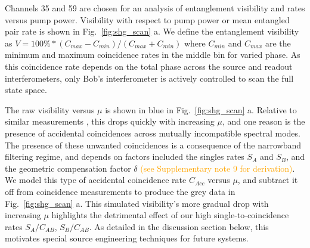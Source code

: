 \documentclass[11pt]{caltech_thesis} %
\begin{document}
Channels 35 and 59 are chosen for an analysis of entanglement visibility and rates versus pump power. Visibility with respect to pump power or mean entangled pair rate is shown in Fig.~\ref{fig:shg_scan} a. We define the entanglement visibility as $V = 100\%*(C_{max} - C_{min})/(C_{max} + C_{min})$ where $C_{min}$ and $C_{max}$ are the minimum and maximum coincidence rates in the middle bin for varied phase. As this coincidence rate depends on the total phase across the source and readout interferometers, only Bob's interferometer is actively controlled to scan the full state space.

The raw visibility versus $\mu$ is shown in blue in Fig.~\ref{fig:shg_scan} a. Relative to similar measurements \autocite{Kim2022}, this drops quickly with increasing $\mu$, and one reason is the presence of accidental coincidences across mutually incompatible spectral modes. The presence of these unwanted coincidences is a consequence of the narrowband filtering regime, and depends on factors included the singles rates $S_A$ and $S_B$, and the geometric compensation factor $\delta$ \textcolor{orange}{(see Supplementary note 9 for derivation)}. We model this type of accidental coincidence rate $C_{Acc}$ versus $\mu$, and subtract it off from coincidence measurements to produce the grey data in Fig.~\ref{fig:shg_scan} a. This simulated visibility's more gradual drop with increasing $\mu$ highlights the detrimental effect of our high single-to-coincidence rates $S_A/C_{AB}$, $S_B/C_{AB}$. As detailed in the discussion section below, this motivates special source engineering techniques for future systems.
\end{document}
